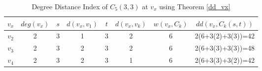 \begin{table}[!ht]
\caption{Degree Distance Index of $C_5(3,3)$ at $v_x$ using Theorem \ref{dd_vx}}
\begin{center}
\begin{tabular}{|c|c|c|c|c|c|c|c|}
\hline 
$v_x$ & $deg(v_x)$ & $s$ & $d(v_x,v_1)$ & $t$ & $d(v_x,v_k)$ & $w(v_x,C_k)$ & $dd(v_x,C_k(s,t))$ \\ 
\hline 
$v_2$ & 2 & 3 & 1 & 3 & 2 & 6 & 2(6+3(2)+3(3))=42 \\ 
\hline 
$v_3$ & 2 & 3 & 2 & 3 & 2 & 6 & 2(6+3(3)+3(3))=48 \\ 
\hline 
$v_4$ & 2 & 3 & 2 & 3 & 1 & 6 & 2(6+3(3)+3(2))=42 \\ 
\hline 
\end{tabular} 
\end{center}
\label{tab:vx_mg2_form}
\end{table}


